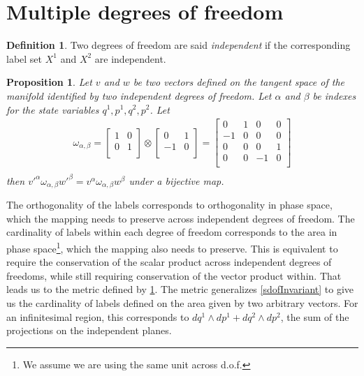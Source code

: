 \documentclass[twocolumn,floatfix,nofootinbib]{revtex4}   %
\theoremstyle{theorem}
\newtheorem{prop}[thm]{Proposition}
\theoremstyle{definition}
\newtheorem{defn}[thm]{Definition}
\begin{document}
\section{Multiple degrees of freedom}

\begin{defn}\label{mdof}
Two degrees of freedom are said \emph{independent} if the corresponding label set $X^1$ and $X^2$ are independent.
\end{defn}

\begin{prop}\label{mdofInvariant}
Let $v$ and $w$ be two vectors defined on the tangent space of the manifold identified by two independent degrees of freedom. Let $\alpha$ and $\beta$ be indexes for the state variables $q^1, p^1, q^2, p^2$. Let
\begin{align*}
\omega_{\alpha, \beta} =  \left[
  \begin{array}{cc}
    1 & 0 \\
    0 & 1 \\
  \end{array}
\right] \otimes \left[
  \begin{array}{cc}
    0 & 1 \\
    -1 & 0 \\
  \end{array}
\right] =
\left[
  \begin{array}{cccc}
    0 & 1 & 0 & 0 \\
    -1 & 0 & 0 & 0 \\
    0 & 0 & 0 & 1 \\
    0 & 0 & -1 & 0 \\
  \end{array}
\right] \\
\end{align*}
then $v'^{\alpha} \omega_{\alpha, \beta} w'^{\beta}=v^{\alpha} \omega_{\alpha, \beta} w^{\beta}$ under a bijective map.
\end{prop}

The orthogonality of the labels corresponds to orthogonality in phase space, which the mapping needs to preserve across independent degrees of freedom. The cardinality of labels within each degree of freedom corresponds to the area in phase space\footnote{We assume we are using the same unit across d.o.f.}, which the mapping also needs to preserve. This is equivalent to require the conservation of the scalar product across independent degrees of freedoms, while still requiring conservation of the vector product within. That leads us to the metric defined by \ref{mdofInvariant}.
The metric generalizes \ref{sdofInvariant} to give us the cardinality of labels defined on the area given by two arbitrary vectors. For an infinitesimal region, this corresponds to $dq^1 \wedge dp^1 + dq^2 \wedge dp^2$, the sum of the projections on the independent planes.
\end{document}
